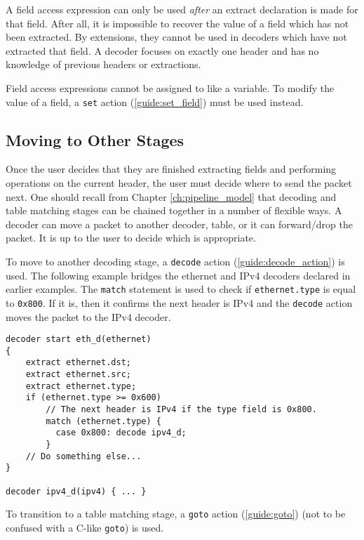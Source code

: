 A field access expression can only be used \textit{after} an extract declaration
is made for that field. After all, it is impossible to recover the value of a
field which has not been extracted. By extensions, they cannot be used in
decoders which have not extracted that field. A decoder focuses on exactly one
header and has no knowledge of previous headers or extractions.

Field access expressions cannot be assigned to like a variable. To modify the
value of a field, a \texttt{set} action (\ref{guide:set_field}) must be used instead.

\subsection{Moving to Other Stages} \label{tut:decoder_next}

Once the user decides that they are finished extracting fields and performing operations on the current header, the user must decide where to send the packet next. One should recall from Chapter \ref{ch:pipeline_model} that decoding and
table matching stages can be chained together in a number of flexible ways.
A decoder can move a packet to another decoder, table, or it can forward/drop
the packet. It is up to the user to decide which is appropriate.

To move to another decoding stage, a \texttt{decode} action (\ref{guide:decode_action})
is used. The following example bridges the ethernet and IPv4 decoders
declared in earlier examples. The \texttt{match} statement is used to check if \texttt{ethernet.type} is equal to
\texttt{0x800}. If it is, then it confirms the next header is IPv4 and the \texttt{decode} action moves the packet to the IPv4 decoder.

\begin{codepage}
\begin{lstlisting}
decoder start eth_d(ethernet)
{
	extract ethernet.dst;
	extract ethernet.src;
	extract ethernet.type;
	if (ethernet.type >= 0x600)
	  	// The next header is IPv4 if the type field is 0x800.
	    match (ethernet.type) {
	      case 0x800: decode ipv4_d;
	    }
	// Do something else...
}

decoder ipv4_d(ipv4) { ... }
\end{lstlisting}
\end{codepage}

To transition to a table matching stage, a \texttt{goto} action (\ref{guide:goto}) (not
to be confused with a C-like \texttt{goto}) is used.

